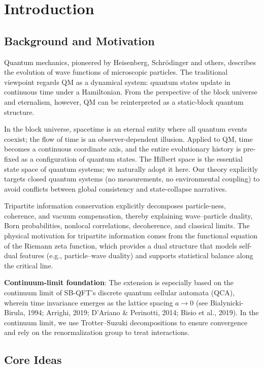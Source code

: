 \documentclass[11pt]{article}
\theoremstyle{definition}
\theoremstyle{remark}
\begin{document}
\section{Introduction}

\subsection{Background and Motivation}

Quantum mechanics, pioneered by Heisenberg, Schrödinger and others, describes the evolution of wave functions of microscopic particles. The traditional viewpoint regards QM as a dynamical system: quantum states update in continuous time under a Hamiltonian. From the perspective of the block universe and eternalism, however, QM can be reinterpreted as a static-block quantum structure.

In the block universe, spacetime is an eternal entity where all quantum events coexist; the flow of time is an observer-dependent illusion. Applied to QM, time becomes a continuous coordinate axis, and the entire evolutionary history is pre-fixed as a configuration of quantum states. The Hilbert space is the essential state space of quantum systems; we naturally adopt it here. Our theory explicitly targets closed quantum systems (no measurements, no environmental coupling) to avoid conflicts between global consistency and state-collapse narratives.

Tripartite information conservation explicitly decomposes particle-ness, coherence, and vacuum compensation, thereby explaining wave--particle duality, Born probabilities, nonlocal correlations, decoherence, and classical limits. The physical motivation for tripartite information comes from the functional equation of the Riemann zeta function, which provides a dual structure that models self-dual features (e.g., particle--wave duality) and supports statistical balance along the critical line.

\textbf{Continuum-limit foundation}: The extension is especially based on the continuum limit of SB-QFT's discrete quantum cellular automata (QCA), wherein time invariance emerges as the lattice spacing \( a\to 0 \) (see Bialynicki-Birula, 1994; Arrighi, 2019; D'Ariano \& Perinotti, 2014; Bisio et al., 2019). In the continuum limit, we use Trotter--Suzuki decompositions to ensure convergence and rely on the renormalization group to treat interactions.

\subsection{Core Ideas}
\end{document}
